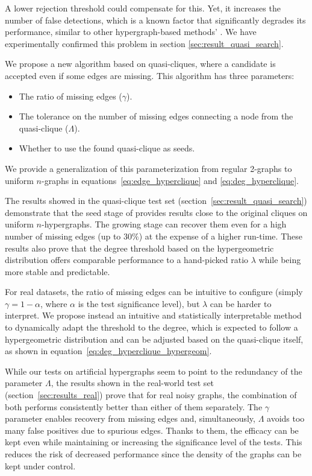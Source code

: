 A lower rejection threshold could compensate for this. Yet, it increases the number
of false detections, which is a known factor that significantly degrades
its performance, similar to other hypergraph-based methods' \cite{koeller2006heuristic}.
We have experimentally confirmed this problem in section \ref{sec:result_quasi_search}.

We propose a new algorithm based on quasi-cliques, where a candidate is accepted
even if some edges are missing. This algorithm has three parameters:

\begin{itemize}
    \item The ratio of missing edges ($\gamma$).
    \item The tolerance on the number of missing edges connecting a node from the quasi-clique ($\Lambda$).
    \item Whether to use the found quasi-clique as seeds.
\end{itemize}

We provide a generalization of this parameterization from regular 2-graphs
\cite{brunato2007effectively} to uniform $n$-graphs in equations~\ref{eq:edge_hyperclique}
and \ref{eq:deg_hyperclique}.

The results showed in the quasi-clique test set (section~\ref{sec:result_quasi_search})
demonstrate that the seed stage of \PresQ provides results close to the original
cliques on uniform $n$-hypergraphs. The growing stage
can recover them even for a high number of missing edges (up to $30\%$) at the expense of a higher run-time.
These results also prove that the degree threshold based on the hypergeometric distribution
offers comparable performance to a hand-picked ratio $\lambda$
while being more stable and predictable.

For real datasets, the ratio of missing edges can be intuitive to configure
(simply $\gamma = 1 - \alpha$, where $\alpha$ is the test significance level), 
but $\lambda$ can be harder to interpret. We propose instead an intuitive and statistically
interpretable method to dynamically adapt the threshold to the degree, which is expected
to follow a hypergeometric distribution and can be adjusted based on the quasi-clique
itself, as shown in equation~\ref{eq:deg_hyperclique_hypergeom}.

While our tests on artificial hypergraphs seem to point to the redundancy of the parameter $\Lambda$,
the results shown in the real-world test set (section~\ref{sec:results_real}) prove that for real noisy graphs,
the combination of both performs consistently better than
either of them separately. The $\gamma$ parameter enables recovery from missing edges and,
simultaneously, $\Lambda$ avoids too many false positives due to 
spurious edges. Thanks to them, the efficacy can be kept even while maintaining or 
increasing the significance level of the tests. This reduces the risk of decreased
performance since the density of the graphs can be kept under control.

